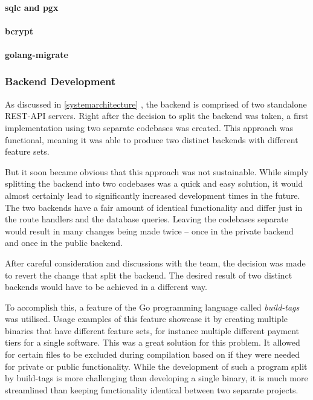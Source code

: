 \paragraph{sqlc and pgx}
\paragraph{bcrypt}
\paragraph{golang-migrate}

\subsubsection{Backend Development}
As discussed in \ref{systemarchitecture} , the
backend is comprised of two standalone REST-API servers. Right after the
decision to split the backend was taken, a first implementation using two
separate codebases was created. This approach was functional, meaning it was
able to produce two distinct backends with different feature sets.

But it soon became obvious that this approach was not sustainable. While simply
splitting the backend into two codebases was a quick and easy solution, it would
almost certainly lead to significantly increased development times in the
future. The two backends have a fair amount of identical functionality and
differ just in the route handlers and the database queries. Leaving the
codebases separate would result in many changes being made twice -- once in the
private backend and once in the public backend.

After careful consideration and discussions with the team, the decision was made
to revert the change that split the backend. The desired result of two distinct
backends would have to be achieved in a different way.

To accomplish this, a feature of the Go programming language called
\textit{build-tags} was utilised. Usage examples of this feature showcase it by
creating multiple binaries that have different feature sets, for instance
multiple different payment tiers for a single software. This was a great
solution for this problem. It allowed for certain files to be excluded during
compilation based on if they were needed for private or public functionality.
While the development of such a program split by build-tags is more challenging
than developing a single binary, it is much more streamlined than keeping
functionality identical between two separate projects.